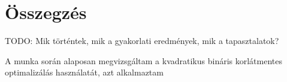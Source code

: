 
\chapter{Összegzés}

TODO: Mik történtek, mik a gyakorlati eredmények, mik a tapasztalatok?

A munka során alaposan megvizsgáltam a kvadratikus bináris korlátmentes optimalizálás használatát, azt alkalmaztam 